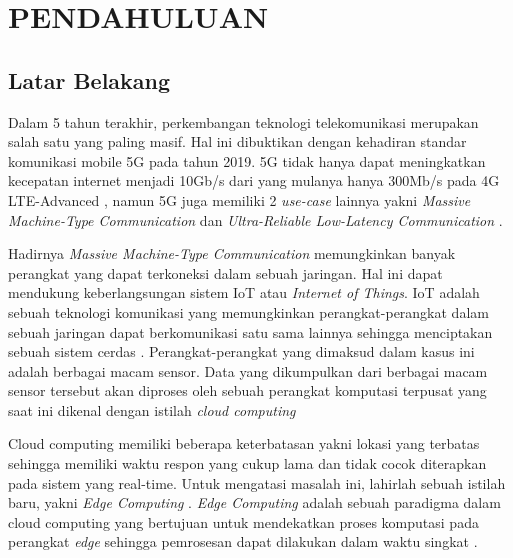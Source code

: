 \chapter{PENDAHULUAN}
\setcounter{page}{1}


\section{Latar Belakang}

Dalam 5 tahun terakhir, perkembangan teknologi telekomunikasi merupakan salah satu yang paling masif.
Hal ini dibuktikan dengan kehadiran standar komunikasi mobile 5G pada tahun 2019. 5G tidak hanya dapat meningkatkan kecepatan internet menjadi
10Gb/s dari yang mulanya hanya 300Mb/s pada 4G LTE-Advanced \citep{4g}, namun 5G juga memiliki 2 \textit{use-case} lainnya
yakni \textit{Massive Machine-Type Communication} dan \textit{Ultra-Reliable Low-Latency Communication} \citep{5g}. 


Hadirnya \textit{Massive Machine-Type Communication} memungkinkan banyak perangkat yang dapat terkoneksi dalam sebuah jaringan.
Hal ini dapat mendukung keberlangsungan sistem IoT atau \textit{Internet of Things}. IoT adalah sebuah teknologi komunikasi
yang memungkinkan perangkat-perangkat dalam sebuah jaringan dapat berkomunikasi satu sama lainnya sehingga menciptakan sebuah sistem cerdas \citep{iot}.
Perangkat-perangkat yang dimaksud dalam kasus ini adalah berbagai macam sensor. Data yang dikumpulkan dari berbagai macam sensor tersebut akan diproses
oleh sebuah perangkat komputasi terpusat yang saat ini dikenal dengan istilah \textit{cloud computing}

Cloud computing memiliki beberapa keterbatasan yakni lokasi yang terbatas sehingga memiliki waktu respon yang cukup lama
dan tidak cocok diterapkan pada sistem yang real-time. Untuk mengatasi masalah ini, lahirlah sebuah istilah baru, yakni \textit{Edge Computing} \citep{edgeCompTerm}.
\textit{Edge Computing} adalah sebuah paradigma dalam cloud computing yang bertujuan untuk mendekatkan proses komputasi pada perangkat \textit{edge}
sehingga pemrosesan dapat dilakukan dalam waktu singkat \citep{edgeComp}.

